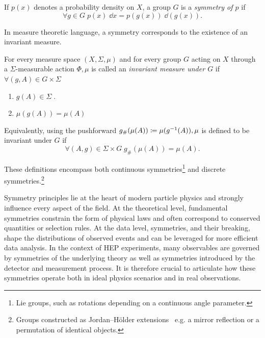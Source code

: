     \begin{definition}
    \label{def:symmetry-of a pdf}
    If $p(x)$ denotes a probability density on $X$, a group $G$ is a \emph{symmetry of \(p\)} if
    \[
        \forall g \in G \; p(x) \; \dd x = p(g(x)) \; \dd(g(x)).
    \]
    \end{definition}
    
    In measure theoretic language, a symmetry corresponds to the existence of an invariant measure.

    \begin{definition}
    \label{def:mu-symmetry}
    For every measure space $(X,\Sigma,\mu)$ and for every group $G$ acting on $X$ through a $\Sigma$-measurable action \(\Phi, \mu\) is called an \emph{invariant measure under \(G\)} if \(\forall (g, A) \in G\times \Sigma\)
    \begin{enumerate}
        \item \(g(A)\in\Sigma\;.\)
        \item     \(
    \mu(g(A))=\mu(A)
    \)
    \end{enumerate}
    Equivalently, using the pushforward \(g_\#(\mu(A))\coloneqq \mu(g^{-1}(A)), \mu\) is defined to be invariant under \(G\) if
    \[
    \forall (A, g) \in\Sigma\times G\; g_\#(\mu(A)) = \mu(A).
    \]
    \end{definition}
    These definitions encompass both continuous symmetries\footnote{Lie groups, such as rotations depending on a continuous angle parameter.} and discrete symmetries.\footnote{Groups constructed as Jordan--H\"older extensions~\cite{solomon_brief_2001, HolderDieOrdnungszahlen, jordan_traite_nodate} e.g. a mirror reflection or a permutation of identical objects.}
    
    Symmetry principles lie at the heart of modern particle physics and strongly influence every aspect of the field.
    At the theoretical level, fundamental symmetries constrain the form of physical laws and often correspond to conserved quantities or selection rules.
    At the data level, symmetries, and their breaking, shape the distributions of observed events and can be leveraged for more efficient data analysis.
    In the context of HEP experiments, many observables are governed by symmetries of the underlying theory as well as symmetries introduced by the detector and measurement process.
    It is therefore crucial to articulate how these symmetries operate both in ideal physics scenarios and in real observations.
    
